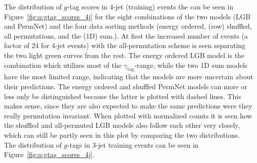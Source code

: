 The distribution of $g$-tag scores in 4-jet (training) events the can be seen in Figure~\ref{fig:q:gtag_scores_4j} for the eight combinations of the two models (LGB and PermNet) and the four data sorting methods (energy ordered, (row) shuffled, all permutations, and the (1D) sum.). At first the increased number of events (a factor of \num{24} for 4-jet events) with the all-permutation scheme is seen separating the two light green curves from the rest. The energy ordered LGB model is the combination which utilizes most of the $\gamma_\mathrm{tag}$-range, while the two 1D sum models have the most limited range, indicating that the models are more uncertain about their predictions. The energy ordered and shuffled PermNet models can more or less only be distinguished because the latter is plotted with dashed lines. This makes sense, since they are also expected to make the same predictions were they really permutation invariant. When plotted with normalized counts it is seen how the shuffled and all-permuted LGB models also follow each other very closely, which can still be partly seen in this plot by comparing the two distributions. The distribution of $g$-tags in 3-jet training events can be seen in Figure~\ref{fig:q:gtag_scores_4j}. 

